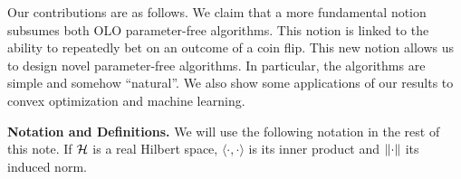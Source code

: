 Our contributions are as follows. We claim that a more fundamental notion
subsumes both \ac{OLO} parameter-free algorithms. This notion is
linked to the ability to repeatedly bet on an outcome of a coin
flip. This new notion allows us to design novel parameter-free algorithms. In particular, the algorithms are simple and somehow ``natural''. We also show some applications of our results to convex optimization and machine learning.

\noindent\textbf{Notation and Definitions.}
We will use the following notation in the rest of this note.
If $\mathcal{H}$ is a real Hilbert space, $\langle \cdot, \cdot \rangle$ is its inner product and $\left\|{\cdot}\right\|$ its induced norm.
